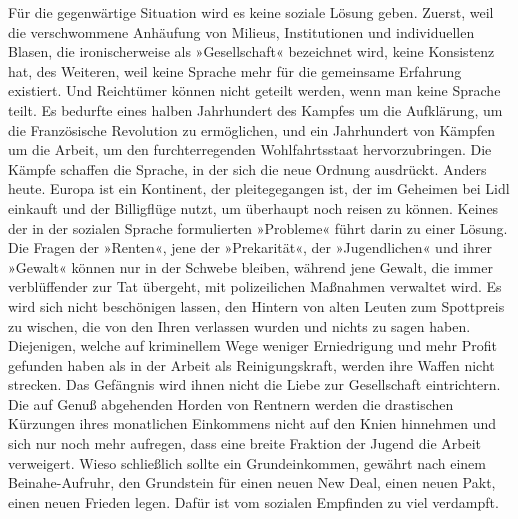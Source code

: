 Für die gegenwärtige Situation wird es keine soziale Lösung geben.
Zuerst, weil die verschwommene Anhäufung von Milieus, Institutionen
und individuellen Blasen, die ironischerweise als »Gesellschaft«
bezeichnet wird, keine Konsistenz hat, des Weiteren, weil keine
Sprache mehr für die gemeinsame Erfahrung existiert. Und Reichtümer
können nicht geteilt werden, wenn man keine Sprache teilt. Es
bedurfte eines halben Jahrhundert des Kampfes um die Aufklärung, um
die Französische Revolution zu ermöglichen, und ein Jahrhundert von
Kämpfen um die Arbeit, um den furchterregenden Wohlfahrtsstaat
hervorzubringen. Die Kämpfe schaffen die Sprache, in der sich die
neue Ordnung ausdrückt. Anders heute. Europa ist ein Kontinent, der
pleitegegangen ist, der im Geheimen bei Lidl einkauft und der
Billigflüge nutzt, um überhaupt noch reisen zu können. Keines der
in der sozialen Sprache formulierten »Probleme« führt darin zu
einer Lösung. Die Fragen der »Renten«, jene der »Prekarität«, der
»Jugendlichen« und ihrer »Gewalt« können nur in der Schwebe
bleiben, während jene Gewalt, die immer verblüffender zur Tat
übergeht, mit polizeilichen Maßnahmen verwaltet wird. Es wird sich
nicht beschönigen lassen, den Hintern von alten Leuten zum
Spottpreis zu wischen, die von den Ihren verlassen wurden und
nichts zu sagen haben. Diejenigen, welche auf kriminellem Wege
weniger Erniedrigung und mehr Profit gefunden haben als in der
Arbeit als Reinigungskraft, werden ihre Waffen nicht strecken. Das
Gefängnis wird ihnen nicht die Liebe zur Gesellschaft eintrichtern.
Die auf Genuß abgehenden Horden von Rentnern werden die drastischen
Kürzungen ihres monatlichen Einkommens nicht auf den Knien
hinnehmen und sich nur noch mehr aufregen, dass eine breite
Fraktion der Jugend die Arbeit verweigert. Wieso schließlich sollte
ein Grundeinkommen, gewährt nach einem Beinahe-Aufruhr, den
Grundstein für einen neuen New Deal, einen neuen Pakt, einen neuen
Frieden legen. Dafür ist vom sozialen Empfinden zu viel verdampft.
\extrapar{}

